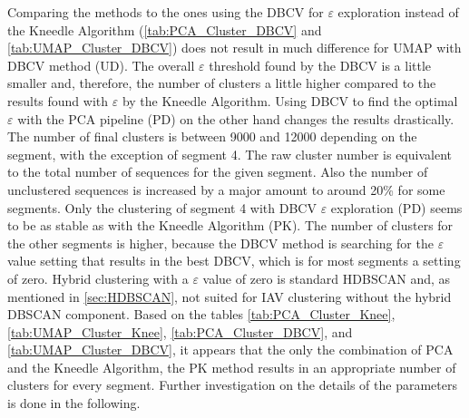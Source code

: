 Comparing the methods to the ones using the \gls{DBCV} for $\varepsilon$ exploration instead of the Kneedle Algorithm (\autoref{tab:PCA_Cluster_DBCV} and \autoref{tab:UMAP_Cluster_DBCV}) does not result in much difference for \gls{UMAP} with \gls{DBCV} method (UD). The overall $\varepsilon$ threshold found by the \gls{DBCV} is a little smaller and, therefore, the number of clusters a little higher compared to the results found with $\varepsilon$ by the Kneedle Algorithm. Using \gls{DBCV} to find the optimal $\varepsilon$ with the \gls{PCA} pipeline (PD) on the other hand changes the results drastically. The number of final clusters is between 9000 and 12000 depending on the segment, with the exception of segment 4. The raw cluster number is equivalent to the total number of sequences for the given segment. Also the number of unclustered sequences is increased by a major amount to around 20\% for some segments. Only the clustering of segment 4 with \gls{DBCV} $\varepsilon$ exploration (PD) seems to be as stable as with the Kneedle Algorithm (PK). The number of clusters for the other segments is higher, because the \gls{DBCV} method is searching for the $\varepsilon$ value setting that results in the best \gls{DBCV}, which is for most segments a setting of zero. Hybrid clustering with a $\varepsilon$ value of zero is standard \gls{HDBSCAN} and, as mentioned in \autoref{sec:HDBSCAN}, not suited for \gls{IAV} clustering without the hybrid \gls{DBSCAN} component. Based on the tables \autoref{tab:PCA_Cluster_Knee}, \autoref{tab:UMAP_Cluster_Knee}, \autoref{tab:PCA_Cluster_DBCV}, and \autoref{tab:UMAP_Cluster_DBCV}, it appears that the only the combination of \gls{PCA} and the Kneedle Algorithm, the PK method results in an appropriate number of clusters for every segment. Further investigation on the details of the parameters is done in the following.

